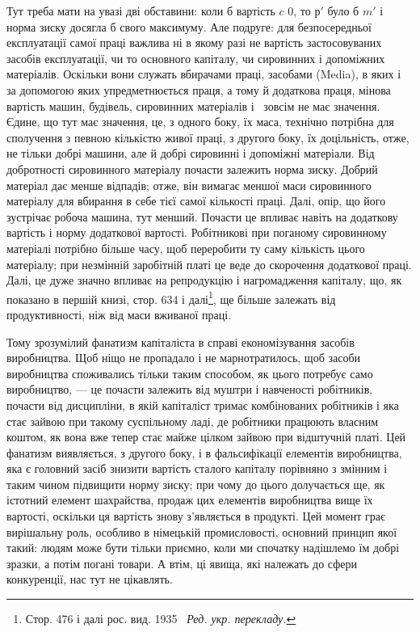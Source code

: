 Тут треба мати на увазі дві обставини: коли б вартість $c$ \deq{} 0,
то $р'$ було б \deq{} $m'$ і норма зиску досягла б свого максимуму.
Але подруге: для безпосередньої експлуатації самої праці важлива
ні в якому разі не вартість застосовуваних засобів експлуатації,
чи то основного капіталу, чи сировинних і допоміжних
матеріалів. Оскільки вони служать вбирачами праці, засобами
(Media), в яких і за допомогою яких упредметнюється праця,
а тому й додаткова праця, мінова вартість машин, будівель,
сировинних матеріалів і~ зовсім не має значення. Єдине, що
тут має значення, це, з одного боку, їх маса, технічно потрібна
для сполучення з певною кількістю живої праці, з другого боку,
їх доцільність, отже, не тільки добрі машини, але й добрі сировинні
і допоміжні матеріали. Від добротності сировинного матеріалу
почасти залежить норма зиску. Добрий матеріал дає менше
відпадів; отже, він вимагає меншої маси сировинного матеріалу
для вбирання в себе тієї самої кількості праці. Далі, опір, що
його зустрічає робоча машина, тут менший. Почасти це впливає
навіть на додаткову вартість і норму додаткової вартості. Робітникові
при поганому сировинному матеріалі потрібно більше
часу, щоб переробити ту саму кількість цього матеріалу; при
незмінній заробітній платі це веде до скорочення додаткової
праці. Далі, це дуже значно впливає на репродукцію і нагромадження
капіталу, що, як показано в першій книзі, стор. 634
і далі\footnote*{
Стор. 476 і далі рос. вид. 1935~ \emph{Ред. укр. перекладу.}
}, ще більше залежать від продуктивності, ніж від маси вживаної
праці.

Тому зрозумілий фанатизм капіталіста в справі економізування
засобів виробництва. Щоб ніщо не пропадало і не марнотратилось,
щоб засоби виробництва споживались тільки таким
способом, як цього потребує само виробництво, — це почасти
залежить від муштри і навченості робітників, почасти від дисципліни,
в якій капіталіст тримає комбінованих робітників і яка стає
зайвою при такому суспільному ладі, де робітники працюють
власним коштом, як вона вже тепер стає майже цілком зайвою
при відштучній платі. Цей фанатизм виявляється, з другого боку,
і в фальсифікації елементів виробництва, яка є головний засіб
знизити вартість сталого капіталу порівняно з змінним і таким
чином підвищити норму зиску; при чому до цього долучається
ще, як істотний елемент шахрайства, продаж цих елементів
виробництва вище їх вартості, оскільки ця вартість знову з’являється
в продукті. Цей момент грає вирішальну роль, особливо
в німецькій промисловості, основний принцип якої такий: людям
може бути тільки приємно, коли ми спочатку надішлемо їм добрі
зразки, а потім погані товари. А втім, ці явища, які належать до
сфери конкуренції, нас тут не цікавлять.

